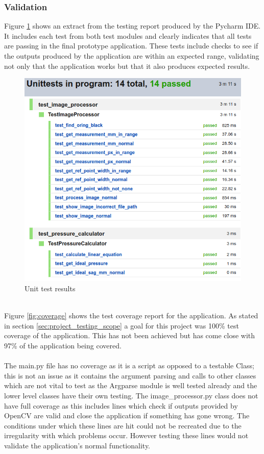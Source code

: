 		\subsubsection{Validation}
			Figure \ref{fig:test_results} shows an extract from the testing report produced by the Pycharm IDE. It includes each test from both test modules and clearly indicates that all tests are passing in the final prototype application. These tests include checks to see if the outputs produced by the application are within an expected range, validating not only that the application works but that it also produces expected results.
			\begin{figure}[h!]
				\centering
				\includegraphics[scale=0.5]{../images/results/test_results.png}
				\caption{Unit test results}
				\label{fig:test_results}
			\end{figure}\\
			Figure \ref{fig:coverage} shows the test coverage report for the application. As stated in section \ref{sec:project_testing_scope} a goal for this project was 100\% test coverage of the application. This has not been achieved but has come close with 97\% of the application being covered. 
			\\\\
			The main.py file has no coverage as it is a script as opposed to a testable Class; this is not an issue as it contains the argument parsing and calls to other classes which are not vital to test as the Argparse module is well tested already and the lower level classes have their own testing. The image\_processor.py class does not have full coverage as this includes lines which check if outputs provided by OpenCV are valid and close the application if something has gone wrong. The conditions under which these lines are hit could not be recreated due to the irregularity with which problems occur. However testing these lines would not validate the application's normal functionality.
